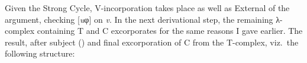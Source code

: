 \documentclass[output=paper]{langsci/langscibook}
\begin{document}
Given the Strong Cycle, V-incorporation takes place as well as
External  of the argument, checking [\emph{u}φ] on
\emph{v}. In the next derivational step, the remaining λ-complex
containing T and C excorporates for the same reasons I gave
earlier. The result, after subject  (\Sbj) and final excorporation
of C from the T-complex, viz.\ the
following structure:

\ea\label{4}
\z
\end{document}
